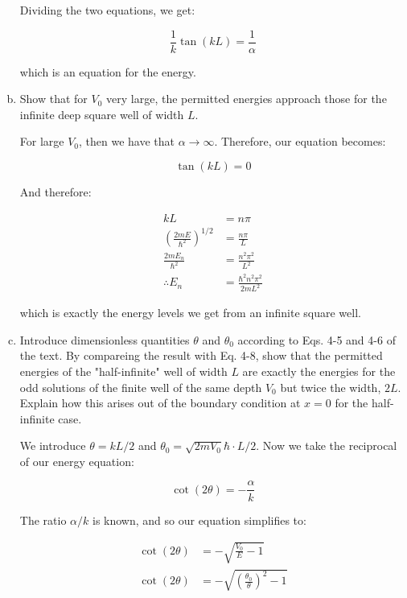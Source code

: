 \documentclass[10pt]{article}
\begin{document}
\begin{enumerate}[(a)]
\begin{solution}
            Dividing the two equations, we get: 

            \[ \frac{1}{k} \tan(kL) = \frac{1}{\alpha}\]

            which is an equation for the energy.
        \end{solution}
        \item Show that for $V_0$ very large, the permitted energies approach those for the infinite deep square well of width $L$.
        
        \begin{solution}
            For large $V_0$, then we have that $\alpha \to \infty$. Therefore, our equation becomes: 

            \[ \tan(kL) = 0\] 

            And therefore: 

            \begin{align*}
                kL &= n\pi\\
                \left(\frac{2mE}{\hbar^2}\right)^{1/2} &= \frac{n\pi}{L}\\
                \frac{2mE_n}{\hbar^2} &= \frac{n^2\pi^2}{L^2}\\
                \therefore E_n &= \frac{\hbar^2 n^2 \pi^2}{2mL^2}
            \end{align*}

            which is exactly the energy levels we get from an infinite square well.
        \end{solution}
        \item Introduce dimensionless quantities $\theta$ and $\theta_0$ according to Eqs. 4-5 and 4-6 of the text. By compareing the result with Eq. 4-8, show that the permitted energies of the "half-infinite" well of width $L$ are exactly the energies for the odd solutions of the finite well of the same depth $V_0$ but twice the width, $2L$. Explain how this arises out of the boundary condition at $x = 0$ for the half-infinite case.
        
        \begin{solution}
            We introduce $\theta = kL/2$ and $\theta_0 = \sqrt{2mV_0}{\hbar} \cdot L/2$. Now we take the reciprocal of our energy equation: 

            \[ \cot (2\theta) = -\frac{\alpha}{k}\]

            The ratio $\alpha/k$ is known, and so our equation simplifies to: 

            \begin{align*}
                \cot (2\theta) &= -\sqrt{\frac{V_0}{E} - 1}\\
                \cot (2\theta) &= -\sqrt{\left(\frac{\theta_0}{\theta}\right)^2 - 1}
            \end{align*}


\end{solution}
\end{enumerate}
\end{document}
